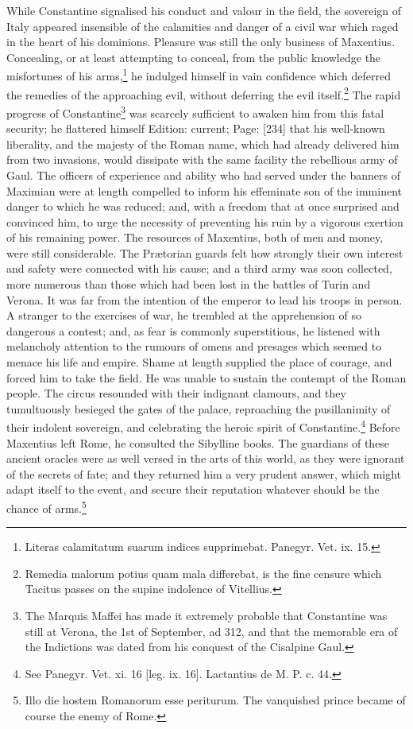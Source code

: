 While Constantine signalised his conduct and valour in the field, the sovereign of Italy appeared insensible of the calamities and danger of a civil war which raged in the heart of his dominions. Pleasure was still the only business of Maxentius. Concealing, or at least attempting to conceal, from the public knowledge the misfortunes of his arms,\footnote{Literas calamitatum suarum indices supprimebat. Panegyr. Vet. ix. 15.} he indulged himself in vain confidence which deferred the remedies of the approaching evil, without deferring the evil itself.\footnote{Remedia malorum potius quam mala differebat, is the fine censure which Tacitus passes on the supine indolence of Vitellius.} The rapid progress of Constantine\footnote{The Marquis Maffei has made it extremely probable that Constantine was still at Verona, the 1st of September, ad 312, and that the memorable era of the Indictions was dated from his conquest of the Cisalpine Gaul.} was scarcely sufficient to awaken him from this fatal security; he flattered himself Edition: current; Page: [234] that his well-known liberality, and the majesty of the Roman name, which had already delivered him from two invasions, would dissipate with the same facility the rebellious army of Gaul. The officers of experience and ability who had served under the banners of Maximian were at length compelled to inform his effeminate son of the imminent danger to which he was reduced; and, with a freedom that at once surprised and convinced him, to urge the necessity of preventing his ruin by a vigorous exertion of his remaining power. The resources of Maxentius, both of men and money, were still considerable. The Prætorian guards felt how strongly their own interest and safety were connected with his cause; and a third army was soon collected, more numerous than those which had been lost in the battles of Turin and Verona. It was far from the intention of the emperor to lead his troops in person. A stranger to the exercises of war, he trembled at the apprehension of so dangerous a contest; and, as fear is commonly superstitious, he listened with melancholy attention to the rumours of omens and presages which seemed to menace his life and empire. Shame at length supplied the place of courage, and forced him to take the field. He was unable to sustain the contempt of the Roman people. The circus resounded with their indignant clamours, and they tumultuously besieged the gates of the palace, reproaching the pusillanimity of their indolent sovereign, and celebrating the heroic spirit of Constantine.\footnote{See Panegyr. Vet. xi. 16 [leg. ix. 16]. Lactantius de M. P. c. 44.} Before Maxentius left Rome, he consulted the Sibylline books. The guardians of these ancient oracles were as well versed in the arts of this world, as they were ignorant of the secrets of fate; and they returned him a very prudent answer, which might adapt itself to the event, and secure their reputation whatever should be the chance of arms.\footnote{Illo die hostem Romanorum esse periturum. The vanquished prince became of course the enemy of Rome.}

